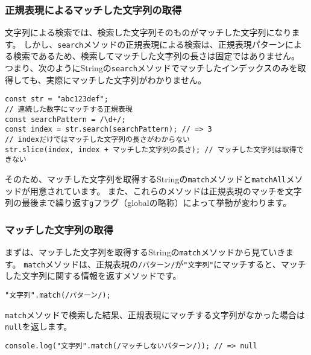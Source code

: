 \hypertarget{match-by-regexp}{%
\subsubsection{正規表現によるマッチした文字列の取得}\label{match-by-regexp}}

文字列による検索では、検索した文字列そのものがマッチした文字列になります。
しかし、\texttt{search}メソッドの正規表現による検索は、正規表現パターンによる検索であるため、検索してマッチした文字列の長さは固定ではありません。
つまり、次のようにStringの\texttt{search}メソッドでマッチしたインデックスのみを取得しても、実際にマッチした文字列がわかりません。

\begin{lstlisting}
const str = "abc123def";
// 連続した数字にマッチする正規表現
const searchPattern = /\d+/;
const index = str.search(searchPattern); // => 3
// indexだけではマッチした文字列の長さがわからない
str.slice(index, index + マッチした文字列の長さ); // マッチした文字列は取得できない
\end{lstlisting}

そのため、マッチした文字列を取得するStringの\texttt{match}メソッドと\texttt{matchAll}メソッドが用意されています。
また、これらのメソッドは正規表現のマッチを文字列の最後まで繰り返す\texttt{g}フラグ（globalの略称）によって挙動が変わります。

\hypertarget{match}{%
\subsubsection{マッチした文字列の取得}\label {match}}

まずは、マッチした文字列を取得するStringの\texttt{match}メソッドから見ていきます。
\texttt{match}メソッドは、正規表現の\texttt{/パターン/}が\texttt{"文字列"}にマッチすると、マッチした文字列に関する情報を返すメソッドです。

\begin{lstlisting}
"文字列".match(/パターン/);
\end{lstlisting}

\texttt{match}メソッドで検索した結果、正規表現にマッチする文字列がなかった場合は\texttt{null}を返します。

\begin{lstlisting}
console.log("文字列".match(/マッチしないパターン/)); // => null
\end{lstlisting}

